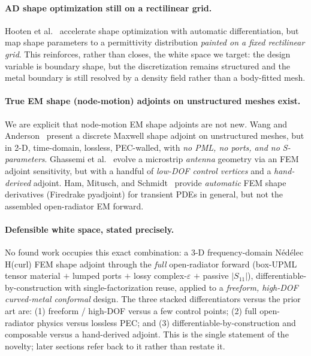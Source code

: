 \documentclass{anvil-paper}
\begin{document}
\paragraph{AD shape optimization still on a rectilinear grid.}
Hooten et al.~\cite{hooten2025} accelerate shape optimization with automatic
differentiation, but map shape parameters to a permittivity distribution
\emph{painted on a fixed rectilinear grid}. This reinforces, rather than closes,
the white space we target: the design variable is boundary shape, but the
discretization remains structured and the metal boundary is still resolved by a
density field rather than a body-fitted mesh.

\paragraph{True EM shape (node-motion) adjoints on unstructured meshes exist.}
We are explicit that node-motion EM shape adjoints are not new. Wang and
Anderson~\cite{wang2011} present a discrete Maxwell shape adjoint on
unstructured meshes, but in 2-D, time-domain, lossless, PEC-walled, with
\emph{no PML, no ports, and no S-parameters}. Ghassemi et
al.~\cite{ghassemi2013} evolve a microstrip \emph{antenna} geometry via an FEM
adjoint sensitivity, but with a handful of \emph{low-DOF control vertices} and a
\emph{hand-derived} adjoint. Ham, Mitusch, and Schmidt~\cite{ham2020} provide
\emph{automatic} FEM shape derivatives (Firedrake pyadjoint) for transient PDEs
in general, but not the assembled open-radiator EM forward.

\paragraph{Defensible white space, stated precisely.}
\label{sec:whitespace}
No found work occupies this exact combination: a 3-D frequency-domain N\'ed\'elec
H(curl) FEM shape adjoint through the \emph{full} open-radiator forward
(box-UPML tensor material $+$ lumped ports $+$ lossy complex-$\varepsilon$ $+$
passive $|S_{11}|$), differentiable-by-construction with single-factorization
reuse, applied to a \emph{freeform, high-DOF curved-metal conformal} design. The
three stacked differentiators versus the prior art are: (1) freeform / high-DOF
versus a few control points; (2) full open-radiator physics versus lossless
PEC; and (3) differentiable-by-construction and composable versus a hand-derived
adjoint. This is the single statement of the novelty; later sections refer back
to it rather than restate it.
\end{document}

